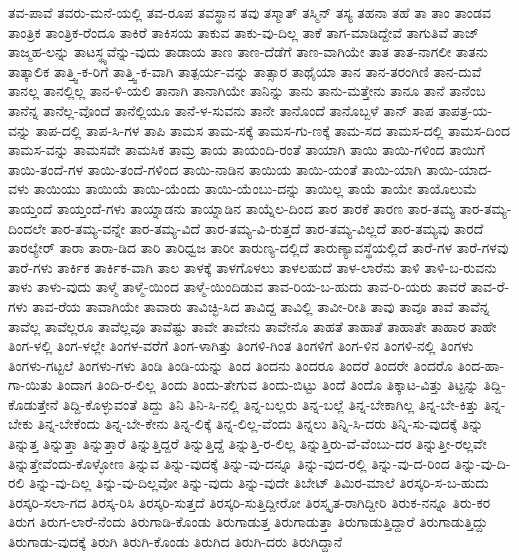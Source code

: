 {ತವ-ಪಾವೆ
ತವರು-ಮನೆ-ಯಲ್ಲಿ
ತವ-ರೂಪ
ತವಸ್ಥಾನ
ತವು
ತಸ್ಮಾತ್
ತಸ್ಮಿನ್
ತಸ್ಯ
ತಹನಾ
ತಹೆ
ತಾ
ತಾಂ
ತಾಂಡವ
ತಾಂತ್ರಿಕ
ತಾಂತ್ರಿಕ-ರೆಂದೂ
ತಾಕಿರೆ
ತಾಕಿಸಯ
ತಾಕುವ
ತಾಕು-ವು-ದಿಲ್ಲ
ತಾಕೆ
ತಾಗ-ಮಾಡಿದ್ದೇವೆ
ತಾಗುತಿವೆ
ತಾಜ್
ತಾಜ್ಮಹ-ಲನ್ನು
ತಾಟಸ್ಥ್ಯವೆನ್ನು-ವುದು
ತಾಡಾಯ
ತಾಣ
ತಾಣ-ದೆಡೆಗೆ
ತಾಣ-ವಾಗಿಯೇ
ತಾತ
ತಾತ-ನಾಗಲೀ
ತಾತನು
ತಾತ್ಕಾಲಿಕ
ತಾತ್ತ್ವಿ-ಕ-ರಿಗೆ
ತಾತ್ತ್ವಿ-ಕ-ವಾಗಿ
ತಾತ್ಪರ್ಯ-ವನ್ನು
ತಾತ್ಸಾರ
ತಾಥೈಯಾ
ತಾನ
ತಾನ-ತರಂಗಿಣಿ
ತಾನ-ದುವೆ
ತಾನಲ್ಲ
ತಾನಲ್ಲಿಲ್ಲ
ತಾನ-ಳಿ-ಯಲಿ
ತಾನಾಗಿ
ತಾನಾಗಿಯೇ
ತಾನಿನ್ನು
ತಾನು
ತಾನು-ಮತ್ತೇನು
ತಾನೂ
ತಾನೆ
ತಾನೆಂಬ
ತಾನೆನ್ನ
ತಾನೆಲ್ಲ-ವೊಂದೆ
ತಾನೆಲ್ಲಿಯೂ
ತಾನೆ-ಳ-ಸುವನು
ತಾನೇ
ತಾನೊಂದೆ
ತಾನೊಬ್ಬಳೆ
ತಾನ್
ತಾಪ
ತಾಪತ್ರ-ಯ-ವನ್ನು
ತಾಪ-ದಲ್ಲಿ
ತಾಪ-ಸಿ-ಗಳ
ತಾಪಿ
ತಾಮಸ
ತಾಮ-ಸಕ್ಕೆ
ತಾಮಸ-ಗು-ಣಕ್ಕೆ
ತಾಮ-ಸದ
ತಾಮಸ-ದಲ್ಲಿ
ತಾಮಸ-ದಿಂದ
ತಾಮಸ-ವನ್ನು
ತಾಮಸವೇ
ತಾಮಸಿಕ
ತಾಮ್ರ
ತಾಯ
ತಾಯಂದಿ-ರಂತೆ
ತಾಯಾಗಿ
ತಾಯಿ
ತಾಯಿ-ಗಳಿಂದ
ತಾಯಿಗೆ
ತಾಯಿ-ತಂದೆ-ಗಳ
ತಾಯಿ-ತಂದೆ-ಗಳಿಂದ
ತಾಯಿ-ನಾಡಿನ
ತಾಯಿಯ
ತಾಯಿ-ಯಂತೆ
ತಾಯಿ-ಯಾಗಿ
ತಾಯಿ-ಯಾದ-ವಳು
ತಾಯಿಯು
ತಾಯಿಯೆ
ತಾಯಿ-ಯೆಂದು
ತಾಯಿ-ಯೆಂಬು-ದನ್ನು
ತಾಯಿಲ್ಲ
ತಾಯೆ
ತಾಯೇ
ತಾಯೊಲುಮೆ
ತಾಯ್ತಂದೆ
ತಾಯ್ತಂದೆ-ಗಳು
ತಾಯ್ನಾಡನು
ತಾಯ್ನಾಡಿನ
ತಾಯ್ನೆಲ-ದಿಂದ
ತಾರ
ತಾರಕೆ
ತಾರಣ
ತಾರ-ತಮ್ಯ
ತಾರ-ತಮ್ಯ-ದಿಂದಲೇ
ತಾರ-ತಮ್ಯ-ವನ್ನೇ
ತಾರ-ತಮ್ಯ-ವಿದೆ
ತಾರ-ತಮ್ಯ-ವಿ-ರುತ್ತದೆ
ತಾರ-ತಮ್ಯ-ವಿಲ್ಲದೆ
ತಾರ-ತಮ್ಯವು
ತಾರದೆ
ತಾರಲ್ಯೇರ್
ತಾರಾ
ತಾರಾ-ಡಿದ
ತಾರಿ
ತಾರಿಧ್ವಜ
ತಾರೀ
ತಾರುಣ್ಯ-ದಲ್ಲಿದೆ
ತಾರುಣ್ಯಾವಸ್ಥೆಯಲ್ಲಿದೆ
ತಾರೆ-ಗಳ
ತಾರೆ-ಗಳವು
ತಾರೆ-ಗಳು
ತಾರ್ಕಿಕ
ತಾರ್ಕಿಕ-ವಾಗಿ
ತಾಲ
ತಾಳಕ್ಕೆ
ತಾಳಗೊಳಲು
ತಾಳಲಹುದೆ
ತಾಳ-ಲಾರೆನು
ತಾಳಿ
ತಾಳಿ-ಬ-ರುವನು
ತಾಳು
ತಾಳು-ವುದು
ತಾಳ್ಮೆ
ತಾಳ್ಮೆ-ಯಿಂದ
ತಾಳ್ಮೆ-ಯಿಂದಿಡುವ
ತಾವ-ರಿಯ-ಬ-ಹುದು
ತಾವ-ರಿ-ಯರು
ತಾವರೆ
ತಾವ-ರೆ-ಗಳು
ತಾವ-ರೆಯ
ತಾವಾಗಿಯೇ
ತಾವಾರು
ತಾವಿಚ್ಛಿ-ಸಿದ
ತಾವಿದ್ದ
ತಾವಿಲ್ಲಿ
ತಾವೀ-ರೀತಿ
ತಾವು
ತಾವೂ
ತಾವೆ
ತಾವೆನ್ನ
ತಾವೆಲ್ಲ
ತಾವೆಲ್ಲರೂ
ತಾವೆಲ್ಲವೂ
ತಾವೆಷ್ಟು
ತಾವೇ
ತಾವೇನು
ತಾವೇನೊ
ತಾಹತೆ
ತಾಹಾತೆ
ತಾಹಾತೇ
ತಾಹಾರ
ತಾಹೇ
ತಿಂಗ-ಳಲ್ಲಿ
ತಿಂಗ-ಳಲ್ಲೇ
ತಿಂಗಳ-ವರೆಗೆ
ತಿಂಗ-ಳಾಗಿತ್ತು
ತಿಂಗಳಿ-ಗಿಂತ
ತಿಂಗಳಿಗೆ
ತಿಂಗ-ಳಿನ
ತಿಂಗಳಿ-ನಲ್ಲಿ
ತಿಂಗಳು
ತಿಂಗಳು-ಗಟ್ಟಲೆ
ತಿಂಗಳು-ಗಳು
ತಿಂಡಿ
ತಿಂಡಿ-ಯನ್ನು
ತಿಂದ
ತಿಂದನು
ತಿಂದರೂ
ತಿಂದರೆ
ತಿಂದರೇ
ತಿಂದರೊ
ತಿಂದ-ಹಾ-ಗಾ-ಯಿತು
ತಿಂದಾಗ
ತಿಂದಿ-ರ-ಲಿಲ್ಲ
ತಿಂದು
ತಿಂದು-ತೇಗುವ
ತಿಂದು-ಬಿಟ್ಟು
ತಿಂದೆ
ತಿಂದೊ
ತಿಕ್ಕಾಟ-ವಿತ್ತು
ತಿಟ್ಟನ್ನು
ತಿದ್ದಿ-ಕೊಡುತ್ತೇನೆ
ತಿದ್ದಿ-ಕೊಳ್ಳುವಂತೆ
ತಿದ್ದು
ತಿನಿ
ತಿನಿ-ಸಿ-ನಲ್ಲಿ
ತಿನ್ನ-ಬಲ್ಲರು
ತಿನ್ನ-ಬಲ್ಲೆ
ತಿನ್ನ-ಬೇಕಾಗಿಲ್ಲ
ತಿನ್ನ-ಬೇ-ಕಿತ್ತು
ತಿನ್ನ-ಬೇಕು
ತಿನ್ನ-ಬೇಕೆಂದು
ತಿನ್ನ-ಬೇ-ಕೇನು
ತಿನ್ನ-ಲಿಕ್ಕೆ
ತಿನ್ನ-ಲಿಲ್ಲ-ವೆಂದು
ತಿನ್ನಲು
ತಿನ್ನಿ-ಸಿ-ದರು
ತಿನ್ನಿ-ಸು-ವುದಕ್ಕೆ
ತಿನ್ನು
ತಿನ್ನುತ್ತ
ತಿನ್ನುತ್ತಾ
ತಿನ್ನುತ್ತಾರೆ
ತಿನ್ನುತ್ತಿದ್ದರೆ
ತಿನ್ನುತ್ತಿದ್ದೆ
ತಿನ್ನುತ್ತಿ-ರ-ಲಿಲ್ಲ
ತಿನ್ನುತ್ತಿರು-ವೆ-ವೆಂಬು-ದರ
ತಿನ್ನುತ್ತೀ-ರಲ್ಲವೇ
ತಿನ್ನುತ್ತೇವೆಂದು-ಕೊಳ್ಳೋಣ
ತಿನ್ನುವ
ತಿನ್ನು-ವುದಕ್ಕೆ
ತಿನ್ನು-ವು-ದನ್ನೂ
ತಿನ್ನು-ವುದ-ರಲ್ಲಿ
ತಿನ್ನು-ವು-ದ-ರಿಂದ
ತಿನ್ನು-ವು-ದಿ-ರಲಿ
ತಿನ್ನು-ವು-ದಿಲ್ಲ
ತಿನ್ನು-ವು-ದಿಲ್ಲವೋ
ತಿನ್ನು-ವುದು
ತಿನ್ನು-ವುದೇ
ತಿಬೇಟ್
ತಿಮಿರ-ಮಾಲೆ
ತಿರಸ್ಕರಿ-ಸ-ಬ-ಹುದು
ತಿರಸ್ಕರಿ-ಸಲಾ-ಗದ
ತಿರಸ್ಕ-ರಿಸಿ
ತಿರಸ್ಕರಿ-ಸುತ್ತದೆ
ತಿರಸ್ಕರಿ-ಸುತ್ತಿದ್ದೀರೋ
ತಿರಸ್ಕೃತ-ರಾಗಿದ್ದೀರಿ
ತಿರುಕ-ನನ್ನೂ
ತಿರು-ಕರ
ತಿರುಗ
ತಿರುಗ-ಲಾರೆ-ನೆಂದು
ತಿರುಗಾಡಿ-ಕೊಂಡು
ತಿರುಗಾಡುತ್ತ
ತಿರುಗಾಡುತ್ತಾ
ತಿರುಗಾಡುತ್ತಿದ್ದಾರೆ
ತಿರುಗಾಡುತ್ತಿದ್ದು
ತಿರುಗಾಡು-ವುದಕ್ಕೆ
ತಿರುಗಿ
ತಿರುಗಿ-ಕೊಂಡು
ತಿರುಗಿದ
ತಿರುಗಿ-ದರು
ತಿರುಗಿದ್ದಾನೆ
}
